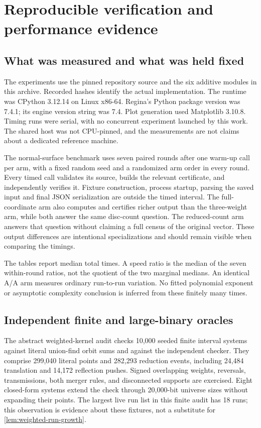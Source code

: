 \section{Reproducible verification and performance evidence}
\label{sec:experiments}

\subsection{What was measured and what was held fixed}

The experiments use the pinned repository source and the six additive modules
in this archive. Recorded hashes identify the actual implementation. The
runtime was CPython 3.12.14 on Linux x86-64. Regina's Python package version
was 7.4.1; its engine version string was 7.4. Plot generation used Matplotlib
3.10.8. Timing runs were serial, with no concurrent experiment launched by
this work. The shared host was not CPU-pinned, and the measurements are not
claims about a dedicated reference machine.

The normal-surface benchmark uses seven paired rounds after one warm-up call
per arm, with a fixed random seed and a randomized arm order in every round.
Every timed call validates its source, builds the relevant certificate, and
independently verifies it. Fixture construction, process startup, parsing the
saved input and final JSON serialization are outside the timed interval.
The full-coordinate arm also computes and certifies richer output than the
three-weight arm, while both answer the same disc-count question. The
reduced-count arm answers that question without claiming a full census of
the original vector. These output differences are intentional specializations
and should remain visible when comparing the timings.

The tables report median total times. A speed ratio is the median of the
seven within-round ratios, not the quotient of the two marginal medians.
An identical A/A arm measures ordinary run-to-run variation. No fitted
polynomial exponent or asymptotic complexity conclusion is inferred from
these finitely many times.

\subsection{Independent finite and large-binary oracles}

The abstract weighted-kernel audit checks 10,000 seeded finite interval
systems against literal union-find orbit sums and against the independent
checker. They comprise 299,040 literal points and 282,293 reduction events,
including 24,484 translation and 14,172 reflection pushes. Signed overlapping
weights, reversals, transmissions, both merger rules, and disconnected
supports are exercised. Eight closed-form systems extend the check through
20,000-bit universe sizes without expanding their points. The largest live
run list in this finite audit has 18 runs; this observation is evidence about
these fixtures, not a substitute for \cref{lem:weighted-run-growth}.

